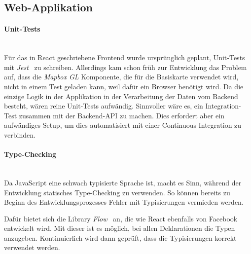 \subsection{Web-Applikation}
\label{tests:Web-Applikation}

\paragraph{Unit-Tests}~\\
Für das in React geschriebene Frontend wurde ursprünglich geplant, Unit-Tests mit \emph{Jest}~\cite{jest} zu schreiben.
Allerdings kam schon früh zur Entwicklung das Problem auf, dass die \emph{Mapbox GL} Komponente, die für die Basiskarte verwendet wird, nicht in einem Test geladen kann, weil dafür ein Browser benötigt wird.
Da die einzige Logik in der Applikation in der Verarbeitung der Daten vom Backend besteht, wären reine Unit-Tests aufwändig.
Sinnvoller wäre es, ein Integration-Test zusammen mit der Backend-API zu machen.
Dies erfordert aber ein aufwändiges Setup, um dies automatisiert mit einer Continuous Integration zu verbinden.


\paragraph{Type-Checking}~\\
Da JavaScript eine schwach typisierte Sprache ist, macht es Sinn, während der Entwicklung statisches Type-Checking zu verwenden.
So können bereits zu Beginn des Entwicklungsprozesses Fehler mit Typisierungen vermieden werden.

Dafür bietet sich die Library \emph{Flow}~\cite{flow} an, die wie React ebenfalls von Facebook entwickelt wird.
Mit dieser ist es möglich, bei allen Deklarationen die Typen anzugeben.
Kontinuierlich wird dann geprüft, dass die Typisierungen korrekt verwendet werden.

